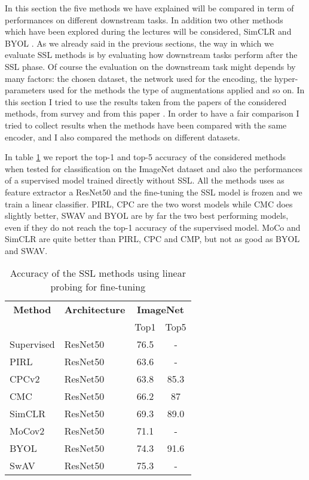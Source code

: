 In this section the five methods we have explained will be compared in term of performances on different downstream tasks. In addition two other methods which have been explored during the lectures will be considered, SimCLR \cite{chen2020simple} and BYOL \cite{grill2020bootstrap}. As we already said in the previous sections, the way in which we evaluate SSL methods is by evaluating how downstream tasks perform after the SSL phase. Of course the evaluation on the downstream task might depends by many factors: the chosen dataset, the network used for the encoding, the hyper-parameters used for the methods the type of augmentations applied and so on. In this section I tried to use the results taken from the papers of the considered methods, from survey \cite{technologies9010002} and from this paper \cite{ericsson2021well}. In order to have a fair comparison I tried to collect results when the methods have been compared with the same encoder, and I also compared the methods on different datasets.

\noindent In table \ref{tab:imagenet-top1-5-acc-comp} we report the top-1 and top-5 accuracy of the considered methods when tested for classification on the ImageNet dataset and also the performances of a supervised model trained directly without SSL. All the methods uses as feature extractor a ResNet50 and the fine-tuning the SSL model is frozen and we train a linear classifier. PIRL, CPC are the two worst models while CMC does slightly better, SWAV and BYOL are by far the two best performing models, even if they do not reach the top-1 accuracy of the supervised model. MoCo and SimCLR are quite better than PIRL, CPC and CMP, but not as good as BYOL and SWAV.
\begin{table}[H]
	\centering
	\begin{tabular}{|l|l|cc|}
		\hline
		\multicolumn{1}{|c|}{\textbf{Method}} & \textbf{Architecture} & \multicolumn{2}{c|}{\textbf{ImageNet}} \\
		\multicolumn{1}{|c|}{} &  & Top1 & Top5 \\
		\hline
		Supervised & ResNet50 & 76.5 & - \\
		\hline
		PIRL & ResNet50 & 63.6 & - \\
		CPCv2 & ResNet50 & 63.8 & 85.3 \\
		CMC & ResNet50  & 66.2 & 87 \\
		SimCLR & ResNet50 & 69.3 & 89.0 \\
		MoCov2 & ResNet50 & 71.1 & - \\
		BYOL & ResNet50  & 74.3 & 91.6 \\ 
		SwAV & ResNet50 & 75.3 & - \\
		\hline
\end{tabular}
	\caption{Accuracy of the SSL methods using linear probing for fine-tuning}
	\label{tab:imagenet-top1-5-acc-comp}
\end{table}


